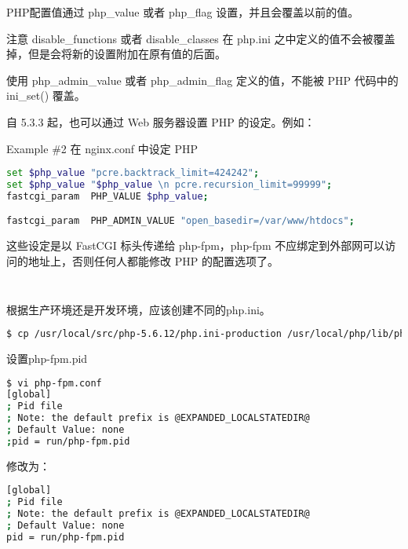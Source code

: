 PHP配置值通过 php\_value 或者 php\_flag 设置，并且会覆盖以前的值。

注意 disable\_functions 或者 disable\_classes 在 php.ini 之中定义的值不会被覆盖掉，但是会将新的设置附加在原有值的后面。

使用 php\_admin\_value 或者 php\_admin\_flag 定义的值，不能被 PHP 代码中的 ini\_set() 覆盖。

自 5.3.3 起，也可以通过 Web 服务器设置 PHP 的设定。例如：

Example \#2 在 nginx.conf 中设定 PHP

\begin{lstlisting}[language=bash]
set $php_value "pcre.backtrack_limit=424242";
set $php_value "$php_value \n pcre.recursion_limit=99999";
fastcgi_param  PHP_VALUE $php_value;

fastcgi_param  PHP_ADMIN_VALUE "open_basedir=/var/www/htdocs";
\end{lstlisting}


这些设定是以 FastCGI 标头传递给 php-fpm，php-fpm 不应绑定到外部网可以访问的地址上，否则任何人都能修改 PHP 的配置选项了。

\begin{lstlisting}[language=bash]

\end{lstlisting}




\begin{lstlisting}[language=bash]

\end{lstlisting}






根据生产环境还是开发环境，应该创建不同的php.ini。

\begin{lstlisting}[language=bash]
$ cp /usr/local/src/php-5.6.12/php.ini-production /usr/local/php/lib/php.ini
\end{lstlisting}

设置php-fpm.pid

\begin{lstlisting}[language=bash]
$ vi php-fpm.conf
[global]
; Pid file
; Note: the default prefix is @EXPANDED_LOCALSTATEDIR@
; Default Value: none
;pid = run/php-fpm.pid
\end{lstlisting}

修改为：

\begin{lstlisting}[language=bash]
[global]
; Pid file
; Note: the default prefix is @EXPANDED_LOCALSTATEDIR@
; Default Value: none
pid = run/php-fpm.pid
\end{lstlisting}

